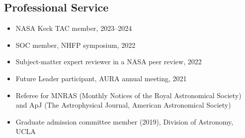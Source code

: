 \documentclass[margin, line]{res}
\begin{document}
\begin{resume}
\section{\sc Professional Service}
\begin{itemize}
\item NASA Keck TAC member, 2023--2024
\item SOC member, NHFP symposium, 2022
\item Subject-matter expert reviewer in a NASA peer review, 2022
\item Future Leader participant, AURA annual meeting, 2021
\item Referee for MNRAS (Monthly Notices of the Royal Astronomical Society) and ApJ (The Astrophysical Journal, American Astronomical Society)
\item Graduate admission committee member (2019), Division of Astronomy, UCLA
\end{itemize}


\end{resume}
\end{document}
